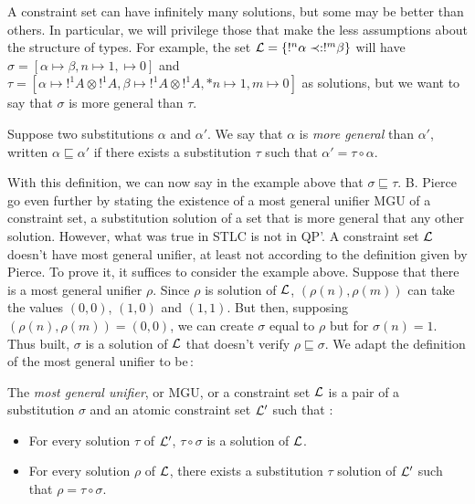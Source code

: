 A constraint set can have infinitely many solutions, but some may be better than others. In particular, we will privilege those
that make the less assumptions about the structure of types. For example, the set $\mathcal{L} = \{!^n \alpha \prec: !^m \beta\}$ will have
$\sigma = [\alpha \mapsto \beta, n \mapsto 1, \mapsto 0]$ and $\tau = [\alpha \mapsto !^1 A \otimes !^1 A, \beta \mapsto !^1 A \otimes !^1 A,*
n \mapsto 1, m \mapsto 0]$ as solutions, but we want to say that $\sigma$ is more general than $\tau$.

\begin{defn} Suppose two substitutions $\alpha$ and $\alpha'$. We say that $\alpha$ is \textit{more general} than $\alpha'$, written
	$\alpha \sqsubseteq \alpha'$ if there exists a substitution $\tau$ such that $\alpha' = \tau \circ \alpha$.
\end{defn}

With this definition, we can now say in the example above that $\sigma \sqsubseteq \tau$. B. Pierce go even further by stating the existence
of a most general unifier MGU of a constraint set, a substitution solution of a set that is more general that any other solution. However,
what was true in STLC is not in QP'. A constraint set $\mathcal{L}$ doesn't have  most general unifier, at least not according to the definition given
by Pierce. To prove it, it suffices to consider the example above. Suppose that there is a most general unifier $\rho$. Since $\rho$ is
solution of $\mathcal{L}$, $(\rho(n), \rho(m))$ can take the values $(0, 0)$, $(1, 0)$ and $(1, 1)$. But then, supposing $(\rho(n), \rho(m)) = (0, 0)$,
we can create $\sigma$ equal to $\rho$ but for $\sigma(n) = 1$. Thus built, $\sigma$ is a solution of $\mathcal{L}$ that doesn't verify
$\rho \sqsubseteq \sigma$.
We adapt the definition of the most general unifier to be\,:

\begin{defn} The \textit{most general unifier}, or MGU, or a constraint set $\mathcal{L}$ is a pair of a substitution $\sigma$ and an atomic
	constraint set $\mathcal{L}'$ such that :
		\begin{itemize}
			\item For every solution $\tau$ of $\mathcal{L}	'$, $\tau \circ \sigma$ is a solution of $\mathcal{L}$.
			\item For every solution $\rho$ of $\mathcal{L}$, there exists a substitution $\tau$ solution of $\mathcal{L}'$ such that $\rho = \tau \circ \sigma$.
		\end{itemize}
\end{defn}

